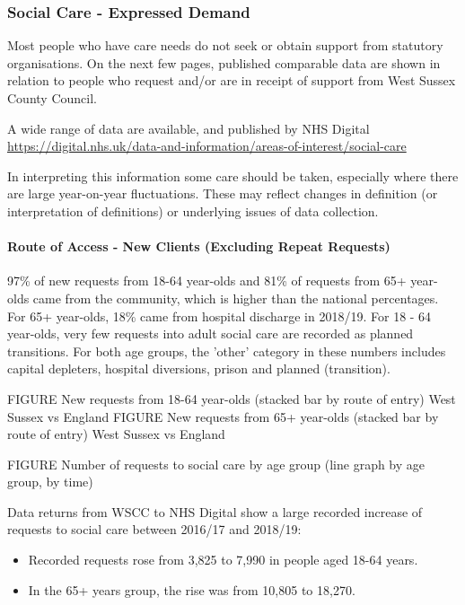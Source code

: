 \subsubsection{Social Care - Expressed Demand}
Most people who have care needs do not seek or obtain support from statutory organisations. On the next few pages, published comparable data are shown in relation to people who request and/or are in receipt of support from West Sussex County Council.

A wide range of data are available, and published by NHS Digital \url{https://digital.nhs.uk/data-and-information/areas-of-interest/social-care}

In interpreting this information some care should be taken, especially where there are large year-on-year fluctuations. These may reflect changes in definition (or interpretation of definitions) or underlying issues of data collection.

\paragraph{Route of Access - New Clients (Excluding Repeat Requests)} 97\% of new requests from 18-64 year-olds and 81\% of requests from 65+ year- olds came from the community, which is higher than the national percentages. For 65+ year-olds, 18\% came from hospital discharge in 2018/19. For 18 - 64 year-olds, very few requests into adult social care are recorded as planned transitions. For both age groups, the 'other' category in these numbers includes capital depleters, hospital diversions, prison and planned (transition). 

FIGURE New requests from 18-64 year-olds (stacked bar by route of entry) West Sussex vs England
FIGURE New requests from 65+ year-olds (stacked bar by route of entry) West Sussex vs England

FIGURE Number of requests to social care by age group (line graph by age group, by time)

Data returns from WSCC to NHS Digital show a large recorded increase of requests to social care between 2016/17 and 2018/19:

\begin{itemize}[noitemsep]
    \item Recorded requests rose from 3,825 to 7,990 in people aged 18-64 years.
    \item In the 65+ years group, the rise was from 10,805 to 18,270.
\end{itemize}

